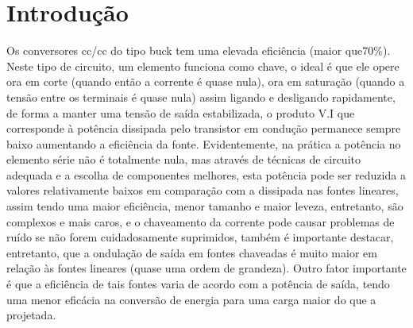 \newpage

\section{Introdução}
Os conversores cc/cc do tipo buck tem uma elevada eficiência (maior que70\%). Neste tipo de circuito, um elemento funciona como chave, o ideal é que ele opere ora em corte (quando então a corrente é quase nula), ora em saturação (quando a tensão entre os terminais é quase nula) assim ligando e desligando rapidamente, de forma a manter uma tensão de saída estabilizada, o produto V.I que corresponde à potência dissipada pelo transistor em condução permanece sempre baixo aumentando a eficiência da fonte. Evidentemente, na prática a potência no elemento série não é totalmente nula, mas através de técnicas de circuito adequada e a escolha de componentes melhores, esta potência pode ser reduzida a valores relativamente baixos em comparação com a dissipada nas fontes lineares, assim tendo uma maior eficiência, menor tamanho e maior leveza, entretanto, são complexos e mais caros, e o chaveamento da corrente pode causar problemas de ruído se não forem cuidadosamente suprimidos, também é importante destacar, entretanto, que a ondulação de saída em fontes chaveadas é muito maior em relação às fontes lineares (quase uma ordem de grandeza). Outro fator importante é que a eficiência de tais fontes varia de acordo com a potência de saída, tendo uma menor eficácia na conversão de energia para uma carga maior do que a projetada.